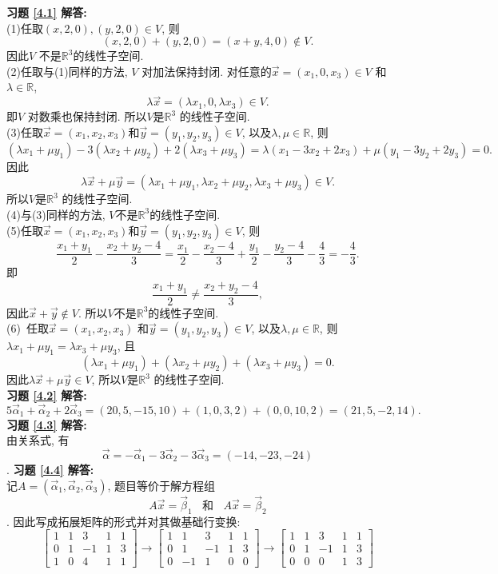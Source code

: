 \textbf{习题 \ref{4.1} 解答:}\\
(1)任取$(x,2,0),(y,2,0)\in V$, 则$$ (x,2,0)+(y,2,0)=(x+y,4,0)\not \in V.$$ 因此$V$ 不是$\mathbb{R}^3$的线性子空间.\\
(2)任取与(1)同样的方法, $V$ 对加法保持封闭. 对任意的$\vec{x}=(x_1,0,x_3)\in V$ 和$\lambda\in \mathbb{R}$, $$\lambda \vec{x}=(\lambda x_1,0,\lambda x_3)\in V.$$ 即$V$ 对数乘也保持封闭. 所以$V$是$\mathbb{R}^3$ 的线性子空间.\\
(3)任取$\vec{x}=(x_1,x_2,x_3)$和$\vec{y}=(y_1,y_2,y_3)\in V$, 以及$\lambda, \mu \in \mathbb{R}$, 则 $$(\lambda x_1+\mu y_1)-3(\lambda x_2+\mu y_2)+2(\lambda x_3+\mu y_3)=\lambda(x_1-3x_2+2x_3)+\mu(y_1-3y_2+2y_3)=0.$$
因此$$\lambda \vec{x}+\mu \vec{y}=(\lambda x_1+\mu y_1,\lambda x_2+\mu y_2,\lambda x_3+\mu y_3)\in V.$$ 所以$V$是$\mathbb{R}^3$ 的线性子空间.\\
(4)与(3)同样的方法, $V$不是$\mathbb{R}^3$的线性子空间.\\
(5)任取$\vec{x}=(x_1,x_2,x_3)$和$\vec{y}=(y_1,y_2,y_3)\in V$, 则$$\frac{x_1+y_1}{2}-\frac{x_2+y_2-4}{3}=\frac{x_1}{2}-\frac{x_2-4}{3}+\frac{y_1}{2}-\frac{y_2-4}{3}-\frac{4}{3}=-\frac{4}{3}.$$
即$$\frac{x_1+y_1}{2}\not =\frac{x_2+y_2-4}{3},$$ 因此$\vec{x}+\vec{y}\not\in V$. 所以$V$不是$\mathbb{R}^3$的线性子空间.\\
(6)\ 任取$\vec{x}=(x_1,x_2,x_3)$ 和$\vec{y}=(y_1,y_2,y_3)\in V$, 以及$\lambda, \mu \in \mathbb{R}$, 则$\lambda x_1+\mu y_1=\lambda x_3+\mu y_3$, 且 $$(\lambda x_1+\mu y_1)+(\lambda x_2+\mu y_2)+(\lambda x_3+\mu y_3)=0.$$ 因此$\lambda \vec{x}+\mu \vec{y}\in V$, 所以$V$是$\mathbb{R}^3$ 的线性子空间.\\
\textbf{习题 \ref{4.2} 解答:}\\
$$5\vec{\alpha}_1+\vec{\alpha}_2+2\vec{\alpha}_3=(20,5,-15,10)+(1,0,3,2)+(0,0,10,2)=(21, 5, -2, 14).$$
\textbf{习题 \ref{4.3} 解答:}\\
由关系式, 有$$\vec{\alpha}=-\vec{\alpha}_1-3\vec{\alpha}_2-3\vec{\alpha}_3=(-14,-23,-24)$$.
\textbf{习题 \ref{4.4} 解答:}\\
记$A=(\vec{\alpha}_1, \vec{\alpha}_2, \vec{\alpha}_3)$, 题目等价于解方程组$$A\vec{x}=\vec{\beta}_1\ \ \  \ \mbox{和}\ \ \ \ A\vec{x}=\vec{\beta}_2$$.
因此写成拓展矩阵的形式并对其做基础行变换:
\begin{displaymath}
\left[\begin{array}{ccccc}1 & 1 & 3 & 1 & 1 \\ 0 & 1 &-1 & 1 & 3\\ 1 & 0 & 4 & 1 & 1 \end{array}\right]\longrightarrow \left[\begin{array}{ccccc}1 & 1 & 3 & 1 & 1 \\ 0 & 1 &-1 & 1 & 3\\ 0 & -1 & 1 & 0 & 0 \end{array}\right]\longrightarrow
\left[\begin{array}{ccccc}1 & 1 & 3 & 1 & 1 \\ 0 & 1 &-1 & 1 & 3\\ 0 & 0 & 0 & 1 & 3 \end{array}\right]\end{displaymath}
